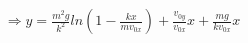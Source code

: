 \documentclass[preview]{standalone}
\begin{document}
\begin{align*}
\Rightarrow y=\frac{m^2g}{k^2}ln(1- \frac{kx}{mv_{0x}})+\frac{v_{0y}}{v_{0x}}x+\frac{mg}{kv_{0x}}x
\end{align*}
\end{document}
